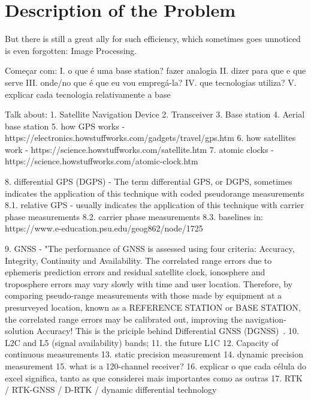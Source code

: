 \section{Description of the Problem}\label{I_description}

But there is still a great ally for such efficiency, which sometimes goes unnoticed is even forgotten: Image Processing.


Começar com:
I. o que é uma base station? fazer analogia
II. dizer para que e que serve
III. onde/no que é que eu vou empregá-la?
IV. que tecnologias utiliza?
V. explicar cada tecnologia relativamente a base


Talk about:
    1. Satellite Navigation Device
    2. Transceiver
    3. Base station
    4. Aerial base station
    5. how GPS works - https://electronics.howstuffworks.com/gadgets/travel/gps.htm
    6. how satellites work - https://science.howstuffworks.com/satellite.htm
    7. atomic clocks - https://science.howstuffworks.com/atomic-clock.htm

    8. differential GPS (DGPS) - The term differential GPS, or DGPS, sometimes indicates the application of this technique with coded pseudorange measurements
    8.1. relative GPS - usually indicates the application of this technique with carrier phase measurements
    8.2. carrier phase measurements
    8.3. baselines
    in: https://www.e-education.psu.edu/geog862/node/1725

    9. GNSS - "The performance of GNSS is assessed using four criteria: Accuracy, Integrity, Continuity and Availability. The correlated range errors due to ephemeris prediction errors and residual satellite clock, ionosphere and troposphere errors may vary slowly with time and user location.
    Therefore, by comparing pseudo-range measurements with those made by equipment at a presurveyed location, known as a REFERENCE STATION or BASE STATION, the correlated range errors may be calibrated out, improving the navigation-solution Accuracy! This is the priciple behind Differential GNSS (DGNSS)~\cite{edseee_9101092}. %
    10. L2C and L5 (signal availability) bands;
    11. the future L1C
    12. Capacity of continuous measurements
    13. static precision measurement
    14. dynamic precision measurement
    15. what is a 120-channel receiver?
    16. explicar o que cada célula do excel significa, tanto as que considerei mais importantes como as outras
    17. RTK / RTK-GNSS / D-RTK / dynamic differential technology~\cite{ayers_geosystems_2011}
        

